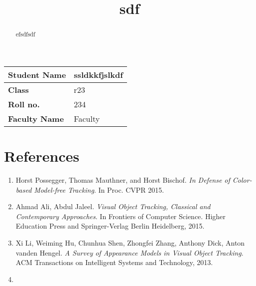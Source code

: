\documentclass{article}
\title{sdf}
\date{}
\begin{document}
    \maketitle

    \begin{table}[h!]
    \centering
    \begin{tabular}{|p{4cm}|p{10cm}|}
        \hline
        \textbf{Student Name} & ssldkkfjslkdf \\ \hline
        \textbf{Class} & r23 \\ \hline
        \textbf{Roll no.} & 234 \\ \hline
        \textbf{Faculty Name} & Faculty \\ \hline
    \end{tabular}
    \label{tab:faculty_student_details}
    \end{table}

    \begin{abstract}
    efsdfsdf
    \end{abstract}

    \section*{References}

    \begin{enumerate}
        \item Horst Possegger, Thomas Mauthner, and Horst Bischof. \textit{In Defense of Color-based Model-free Tracking}. In Proc. CVPR 2015.
        \item Ahmad Ali, Abdul Jaleel. \textit{Visual Object Tracking, Classical and Contemporary Approaches}. In Frontiers of Computer Science. Higher Education Press and Springer-Verlag Berlin Heidelberg, 2015.
        \item Xi Li, Weiming Hu, Chunhua Shen, Zhongfei Zhang, Anthony Dick, Anton vanden Hengel. \textit{A Survey of Appearance Models in Visual Object Tracking}. ACM Transactions on Intelligent Systems and Technology, 2013.
        \item 
    \end{enumerate}

    
\end{document}
